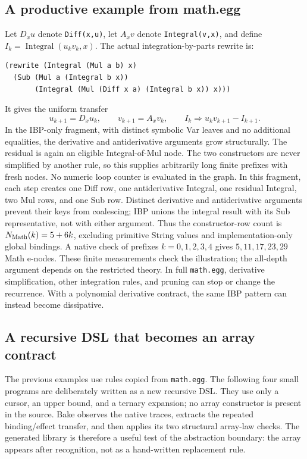 \documentclass[11pt,a4paper]{article}
\newcommand{\code}[1]{\texttt{#1}}
\begin{document}
\subsection{A productive example from math.egg}
Let $D_x u$ denote \code{Diff(x,u)}, let $A_x v$ denote
\code{Integral(v,x)}, and define $I_k=\operatorname{Integral}(u_kv_k,x)$.
The actual integration-by-parts rewrite is:
\begin{lstlisting}
(rewrite (Integral (Mul a b) x)
  (Sub (Mul a (Integral b x))
       (Integral (Mul (Diff x a) (Integral b x)) x)))
\end{lstlisting}
It gives the uniform transfer
\begin{equation}
 u_{k+1}=D_xu_k,\qquad v_{k+1}=A_xv_k,\qquad
 I_k\Rightarrow u_kv_{k+1}-I_{k+1}.
\end{equation}
In the IBP-only fragment, with distinct symbolic Var leaves and no additional
equalities, the derivative and antiderivative arguments grow structurally.
The residual is again an eligible Integral-of-Mul node. The two constructors
are never simplified by another rule, so this supplies arbitrarily long finite
prefixes with fresh nodes. No numeric loop counter is evaluated in the graph.
\MathInfi
In this fragment, each step creates one Diff row, one antiderivative Integral,
one residual Integral, two Mul rows, and one Sub row. Distinct derivative and
antiderivative arguments prevent their keys from coalescing; IBP unions the
integral result with its Sub representative, not with either argument. Thus the
constructor-row count is $N_{\rm Math}(k)=5+6k$, excluding primitive String values
and implementation-only global bindings.
A native check of prefixes $k=0,1,2,3,4$ gives $5,11,17,23,29$ Math e-nodes.
These finite measurements check the illustration; the all-depth argument depends
on the restricted theory. In full \texttt{math.egg}, derivative simplification,
other integration rules, and pruning can stop or change the recurrence. With a
polynomial derivative contract, the same IBP pattern can instead become dissipative.


\subsection{A recursive DSL that becomes an array contract}
The previous examples use rules copied from \texttt{math.egg}. The following
four small programs are deliberately written as a new recursive DSL. They use
only a cursor, an upper bound, and a ternary expansion; no array constructor is
present in the source. Bake observes the native traces, extracts the repeated
binding/effect transfer, and then applies its two structural array-law checks.
The generated library is therefore a useful test of the abstraction boundary:
the array appears after recognition, not as a hand-written replacement rule.
\end{document}
